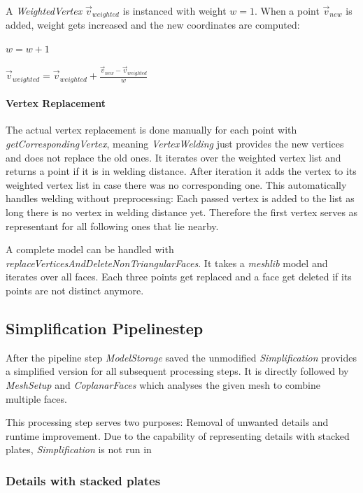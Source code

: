 \documentclass[../ClassicThesis.tex]{subfiles}
\begin{document}
A \emph{WeightedVertex} $\vec{v}_{weighted}$ is instanced with weight $w = 1$. When a point $\vec{v}_{new}$ is added, weight gets increased and the new coordinates are computed:

$ w = w + 1 $

$ \vec{v}_{weighted} = \vec{v}_{weighted} + \frac{\vec{v}_{new} - \vec{v}_{weighted}}{w}$


\paragraph{Vertex Replacement}

The actual vertex replacement is done manually for each point with \emph{getCorrespondingVertex}, meaning \emph{VertexWelding} just provides the new vertices and does not replace the old ones. It iterates over the weighted vertex list and returns a point if it is in welding distance. After iteration it adds the vertex to its weighted vertex list in case there was no corresponding one. This automatically handles welding without preprocessing: Each passed vertex is added to the list as long there is no vertex in welding distance yet. Therefore the first vertex serves as representant for all following ones that lie nearby.

A complete model can be handled with \emph{replaceVerticesAndDeleteNonTriangularFaces}. It takes a \emph{meshlib} model and iterates over all faces. Each three points get replaced and a face get deleted if its points are not distinct anymore.




\subsection{Simplification Pipelinestep}

After the pipeline step \emph{ModelStorage} saved the unmodified {\threedmodel} \emph{Simplification} provides a simplified version for all subsequent processing steps. It is directly followed by \emph{MeshSetup} and \emph{CoplanarFaces} which analyses the given mesh to combine multiple faces.

This processing step serves two purposes: Removal of unwanted details and runtime improvement. Due to the capability of representing details with stacked plates, \emph{Simplification} is not run in 

\subsubsection{Details with stacked plates}
\end{document}

